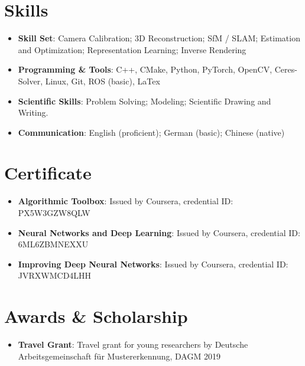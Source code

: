 \documentclass[letterpaper,11pt]{article}
\newcommand{\resumeItem}[2]{
  \item\small{
    \textbf{#1}{: #2 \vspace{-2pt}}
  }
}
\newcommand{\resumeSubItem}[2]{\resumeItem{#1}{#2}\vspace{-4pt}}
\newcommand{\resumeSubHeadingListStart}{\begin{itemize}[leftmargin=*]}
\newcommand{\resumeSubHeadingListEnd}{\end{itemize}}
\begin{document}
\section{Skills}
  \resumeSubHeadingListStart
  	\resumeItem{Skill Set}{Camera Calibration; 3D Reconstruction; SfM / SLAM; Estimation and Optimization; Representation Learning; Inverse Rendering}
    \resumeSubItem{Programming \& Tools}
      {C++, CMake, Python, PyTorch, OpenCV, Ceres-Solver, Linux, Git, ROS (basic), LaTex}
    \resumeSubItem{Scientific Skills}
      {Problem Solving; Modeling; Scientific Drawing and Writing.}
    \resumeSubItem{Communication}
      {English (proficient); German (basic); Chinese (native)}
  \resumeSubHeadingListEnd

\section{Certificate}
\resumeSubHeadingListStart
\resumeItem{Algorithmic Toolbox}{Issued by Coursera, credential ID: PX5W3GZW8QLW}
\resumeItem{Neural Networks and Deep Learning}{Issued by Coursera, credential ID: 6ML6ZBMNEXXU}
\resumeItem{Improving Deep Neural Networks}{Issued by Coursera, credential ID: JVRXWMCD4LHH}
\resumeSubHeadingListEnd

\section{Awards  \& Scholarship}
\resumeSubHeadingListStart
\resumeItem{Travel Grant}{Travel grant for young researchers by Deutsche Arbeitsgemeinschaft f\"ur Mustererkennung, DAGM 2019}
\resumeSubHeadingListEnd

  
\end{document}
